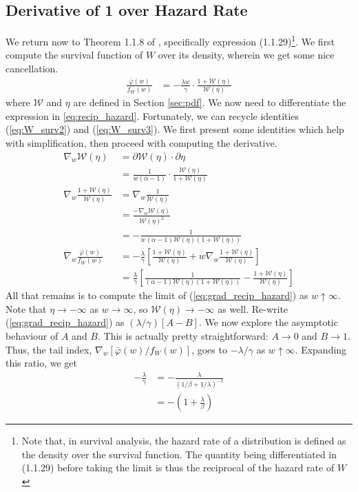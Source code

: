 \documentclass{article}
\newcommand{\sW}{\mathscr{W}}
\newcommand{\swe}{\mathscr{W}(\eta)}
\begin{document}
\subsection{Derivative of 1 over Hazard Rate}

We return now to Theorem 1.1.8 of \citet{deH06}, specifically expression (1.1.29)\footnote{Note that, in survival analysis, the hazard rate of a distribution is defined as the density over the survival function. The quantity being differentiated in (1.1.29) before taking the limit is thus the reciprocal of the hazard rate of $W$}. We first compute the survival function of $W$ over its density, wherein we get some nice cancellation.
%
\begin{align}
    \frac{\bar{\varphi}(w)}{f_W(w)} &= - \frac{\lambda w}{\gamma} \cdot \frac{1 + \sW(\eta)}{\sW(\eta)} \label{eq:recip_hazard}
\end{align}
%
where $\sW$ and $\eta$ are defined in Section \ref{sec:pdf}. We now need to differentiate the expression in \ref{eq:recip_hazard}. Fortunately, we can recycle identities (\ref{eq:W_surv2}) and (\ref{eq:W_surv3}). We first present some identities which help with simplification, then proceed with computing the derivative.
%
\begin{align}
    \nabla_w \sW(\eta) &= \partial \sW(\eta) \cdot \partial \eta\\
    &= \frac{1}{w(\alpha - 1)} \cdot \frac{\sW(\eta)}{ 1 + \sW(\eta)}\\
    \nabla_w \frac{1 + \sW(\eta)}{\sW(\eta)} &= \nabla_w \frac{1}{\swe}\\
    &= \frac{-\nabla_w \swe}{\swe^2}\\
    &= - \frac{1}{w (\alpha - 1) \swe (1 + \swe)}\\
    \nabla_w \frac{\bar{\varphi}(w)}{f_W(w)} &= - \frac{\lambda}{\gamma} \left[ \frac{1 + \swe}{\swe} + w \nabla_w \frac{1 + \sW(\eta)}{\sW(\eta)} \right]\\
    &= \frac{\lambda}{\gamma} \left[ \frac{1}{(\alpha - 1) \swe (1 + \swe)} - \frac{1 + \swe}{\swe} \right] \label{eq:grad_recip_hazard}
\end{align}
%
All that remains is to compute the limit of (\ref{eq:grad_recip_hazard}) as $w \uparrow \infty$. Note that $\eta \rightarrow - \infty$ as $w \rightarrow \infty$, so $\sW(\eta) \rightarrow - \infty$ as well. Re-write (\ref{eq:grad_recip_hazard}) as $(\lambda / \gamma) [ A - B]$. We now explore the asymptotic behaviour of $A$ and $B$. This is actually pretty straightforward: $A \rightarrow 0$ and $B \rightarrow 1$. Thus, the tail index, $\nabla_w [\bar{\varphi}(w) / f_W(w)]$, goes to $- \lambda / \gamma$ as $w \uparrow \infty$. Expanding this ratio, we get
%
\begin{align}
    - \frac{\lambda}{\gamma} &= - \frac{\lambda}{(1/\beta + 1/\lambda)^{-1}}\\
    &= - \left( 1 + \frac{\lambda}{\beta} \right)
\end{align}
\end{document}

